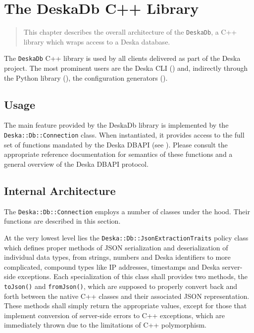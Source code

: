 \documentclass[deska]{subfiles}
\begin{document}
\chapter{The DeskaDb C++ Library}
\label{sec:cpp-deskadb}

\begin{abstract}
This chapter describes the overall architecture of the {\tt DeskaDb}, a C++ library which wraps access to a Deska
database.
\end{abstract}

The {\tt DeskaDb} C++ library is used by all clients delivered as part of the Deska project.  The most prominent users
are the Deska CLI () and, indirectly through the Python library (), the
configuration generators ().

\section{Usage}

The main feature provided by the DeskaDb library is implemented by the {\tt Deska::Db::Connection} class.  When
instantiated, it provides access to the full set of functions mandated by the Deska DBAPI (see ).
Please consult the appropriate reference documentation for semantics of these functions and a general overview of the
Deska DBAPI protocol.

\section{Internal Architecture}

The {\tt Deska::Db::Connection} employs a number of classes under the hood.  Their functions are described in this
section.

At the very lowest level lies the {\tt Deska::Db::JsonExtractionTraits} policy class which defines proper methods of
JSON serialization and deserialization of individual data types, from strings, numbers and Deska identifiers to more
complicated, compound types like IP addresses, timestamps and Deska server-side exceptions.  Each specialization of this
class shall provides two methods, the {\tt toJson()} and {\tt fromJson()}, which are supposed to properly convert back
and forth between the native C++ classes and their associated JSON representation.  These methods shall simply return
the appropriate values, except for those that implement conversion of server-side errors to C++ exceptions, which are
immediately thrown due to the limitations of C++ polymorphism.
\end{document}

